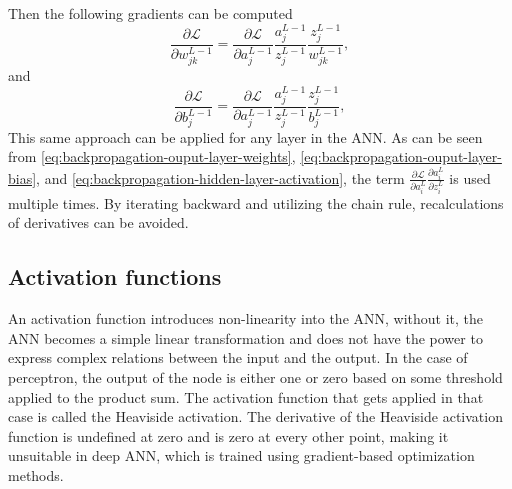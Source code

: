 Then the following gradients can be computed
\begin{equation}
    \frac{\partial \mathcal{L}}{\partial w_{jk}^{L-1}} = \frac{\partial \mathcal{L}}{\partial a_j^{L-1}} \frac{a_j^{L-1}}{z_j^{L-1}} \frac{z_j^{L-1}}{w_{jk}^{L-1}},
\end{equation}
and
\begin{equation}
    \frac{\partial \mathcal{L}}{\partial b_j^{L-1}} = \frac{\partial \mathcal{L}}{\partial a_j^{L-1}} \frac{a_j^{L-1}}{z_j^{L-1}} \frac{z_j^{L-1}}{b_j^{L-1}},
\end{equation}
This same approach can be applied for any layer in the \gls{ANN}.
As can be seen from \autoref{eq:backpropagation-ouput-layer-weights}, \autoref{eq:backpropagation-ouput-layer-bias}, and \autoref{eq:backpropagation-hidden-layer-activation}, the term $\frac{\partial\mathcal{L}}{\partial a_i^L} \frac{\partial a_i^L}{\partial z_i^L}$ is used multiple times.
By iterating backward and utilizing the chain rule, recalculations of derivatives can be avoided.

\subsection{Activation functions}

An activation function introduces non-linearity into the \gls{ANN}, without it, the \gls{ANN} becomes a simple linear transformation and does not have the power to express complex relations between the input and the output.
In the case of perceptron, the output of the node is either one or zero based on some threshold applied to the product sum.
The activation function that gets applied in that case is called the Heaviside activation.
The derivative of the Heaviside activation function is undefined at zero and is zero at every other point, making it unsuitable in deep \gls{ANN}, which is trained using gradient-based optimization methods.

